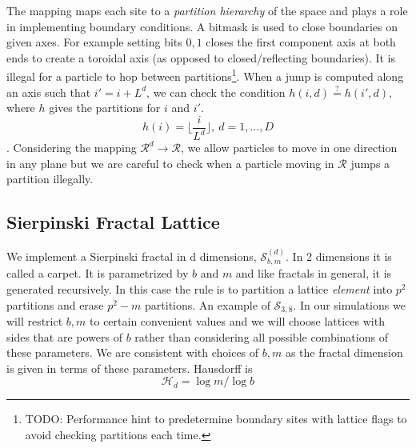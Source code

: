 \documentclass[pre,twocolumn,preprintnumbers,amsmath,amssymb,floatfix,nofootinbib]{revtex4}
\begin{document}
The mapping maps each site to a \textit{partition hierarchy} of the space and plays a role in implementing boundary conditions. A bitmask is used to close boundaries on given axes. For example setting bits $0,1$ closes the first component axis at both ends to create a toroidal axis (as opposed to closed/reflecting boundaries). It is illegal for a particle to hop between partitions\footnote{TODO: Performance hint to predetermine boundary sites with lattice flags to avoid checking partitions each time. }. When a jump is computed along an axis such that $i'= i + L^d$, we can check the condition $h(i,d)\stackrel{?}{=}h(i',d)$, where $h$ gives the partitions for $i$ and $i'$. \begin{equation}
h(i) = \Bigg\lfloor \frac{i}{L^d} \Bigg\rfloor,\ d= 1,...,D
\end{equation}.
Considering the mapping $\mathcal{R}^d\to \mathcal{R}$, we allow particles to move in one direction in any plane but we are careful to check when a particle moving in $\mathcal{R}$ jumps a partition illegally.


\subsection{Sierpinski Fractal Lattice}

We implement a Sierpinski fractal in d dimensions, $\mathcal{S}^{(d)}_{b,m}$. In 2 dimensions it is called a carpet. It is parametrized by $b$ and $m$ and like fractals in general, it is generated recursively. In this case the rule is to partition a lattice \textit{element} into $p^2$ partitions and erase $p^2-m$ partitions. An example of $\mathcal{S}_{3,8}$. In our simulations we will restrict $b,m$ to certain convenient values and we will choose lattices with sides that are powers of $b$ rather than considering all possible combinations of these parameters. We are consistent with choices of $b,m$ as the fractal dimension is given in terms of these parameters. Hausdorff is 
\begin{equation}
\mathcal{H}_d = \log m / \log b
\end{equation}
\end{document}

